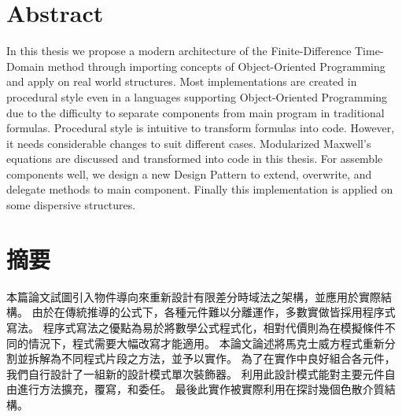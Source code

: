 \cleardoublepage
\chapter{Abstract}
In this thesis we propose a modern architecture of the Finite-Difference Time-Domain method through importing concepts
of Object-Oriented Programming and apply on real world structures. Most implementations are created in procedural style
even in a languages supporting Object-Oriented Programming due to the difficulty to separate components from main
program in traditional formulas. Procedural style is intuitive to transform formulas into code. However, it needs
considerable changes to suit different cases. Modularized Maxwell's equations are discussed and transformed into code in
this thesis. For assemble components well, we design a new Design Pattern to extend, overwrite, and delegate methods to
main component. Finally this implementation is applied on some dispersive structures.

\cleardoublepage
\chapter{\kai 摘要}
{
\kai
本篇論文試圖引入物件導向來重新設計有限差分時域法之架構，並應用於實際結構。
由於在傳統推導的公式下，各種元件難以分離運作，多數實做皆採用程序式寫法。
程序式寫法之優點為易於將數學公式程式化，相對代價則為在模擬條件不同的情況下，程式需要大幅改寫才能適用。
本論文論述將馬克士威方程式重新分割並拆解為不同程式片段之方法，並予以實作。
為了在實作中良好組合各元件，我們自行設計了一組新的設計模式單次裝飾器。
利用此設計模式能對主要元件自由進行方法擴充，覆寫，和委任。
最後此實作被實際利用在探討幾個色散介質結構。}
